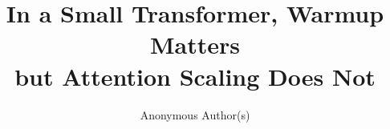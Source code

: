 \documentclass{article}
\title{In a Small Transformer, Warmup Matters\\but Attention Scaling Does Not}
\author{Anonymous Author(s)}
\begin{document}
\maketitle

\begin{abstract}

\end{abstract}







\label{pw:mainend}




\newpage

\end{document}
